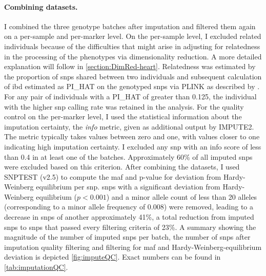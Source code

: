 \paragraph{Combining datasets.} I combined the three genotype batches after imputation and filtered them again on a per-sample and per-marker level. On the per-sample level, I excluded related individuals because of the difficulties that might arise in adjusting for relatedness in the processing of the phenotypes via dimensionality reduction. A more detailed explanation will follow in \cref{section:DimRed-heart}. Relatedness was estimated by the proportion of \glspl{snp} shared between two individuals and subsequent calculation of \gls{ibd} estimated as PI\_HAT on the genotyped \glspl{snp} via PLINK as described by \citep{Anderson2010}. For any pair of individuals with a PI\_HAT of greater than \num{0.125}, the individual with the higher \gls{snp} calling rate was retained in the analysis. For the quality control on the per-marker level, I used the statistical information about the imputation certainty, the \textit{info} metric,  given as additional output by IMPUTE2. The metric typically takes values between zero and one, with values closer to one indicating high imputation certainty. I excluded any \gls{snp} with an info score of less than \num{0.4} in at least one of the batches. Approximately \num{60}\% of all imputed \glspl{snp} were excluded based on this criterion.  After combining the datasets, I used SNPTEST (v2.5) \citep{Marchini2010} to compute the \gls{maf} and p-value for deviation from Hardy-Weinberg equilibrium per \gls{snp}. \glspl{snp} with a significant deviation from Hardy-Weinberg equilibrium (\(p <0.001\)) and a minor allele count of less than \num{20} alleles (corresponding to a minor allele frequency of \num{0.008}) were removed, leading to a decrease in \glspl{snp} of another approximately \num{41}\%, a total reduction from imputed \glspl{snp} to \glspl{snp} that passed every filtering criteria of \num{23}\%.  A summary showing the magnitude of the number of imputed \glspl{snp} per batch, the number of \glspl{snp} after imputation quality filtering and filtering for \gls{maf} and Hardy-Weinberg-equilibrium deviation is depicted \cref{fig:imputeQC}. Exact numbers can be found in \cref{tab:imputationQC}.

